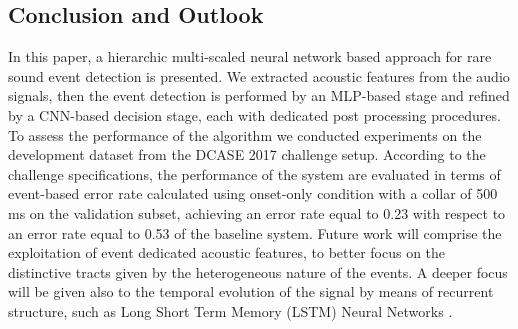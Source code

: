 \documentclass{article}
\begin{document}
\begin{sloppy}
\section{Conclusion and Outlook}
\label{sec:conclusion}
 In this paper, a hierarchic multi-scaled neural network based approach for rare sound event detection is presented.  We extracted acoustic features from the audio signals, then the event detection is performed by an MLP-based stage and refined by a CNN-based decision stage, each with dedicated post processing procedures. To assess the performance of the algorithm we conducted experiments on the development dataset from the DCASE 2017 challenge setup. According to the challenge specifications, the performance of the system are evaluated in terms of event-based error rate calculated using onset-only condition with a collar of 500 ms on the validation subset, achieving an error rate equal to 0.23 with respect to an error rate equal to 0.53 of the baseline system. Future work will comprise the exploitation of event dedicated acoustic features, to better focus on the distinctive tracts given by the heterogeneous nature of the events. A deeper focus will be given also to the temporal evolution of the signal by means of recurrent structure, such as Long Short Term Memory (LSTM) Neural Networks \cite{hochreiter1997long}.




%


\end{sloppy}
\end{document}

